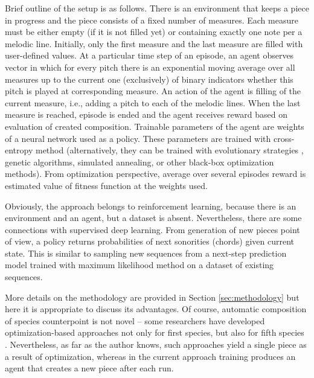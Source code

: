 \documentclass{article}
\begin{document}
Brief outline of the setup is as follows. There is an environment that keeps a piece in progress and the piece consists of a fixed number of measures. Each measure must be either empty (if it is not filled yet) or containing exactly one note per a melodic line. Initially, only the first measure and the last measure are filled with user-defined values. At a particular time step of an episode, an agent observes vector in which for every pitch there is an exponential moving average over all measures up to the current one (exclusively) of binary indicators whether this pitch is played at corresponding measure. An action of the agent is filling of the current measure, i.e., adding a pitch to each of the melodic lines. When the last measure is reached, episode is ended and the agent receives reward based on evaluation of created composition. Trainable parameters of the agent are weights of a neural network used as a policy. These parameters are trained with cross-entropy method \cite{rubinstein1997optimization} (alternatively, they can be trained with evolutionary strategies \cite{salimans2017evolution}, genetic algorithms, simulated annealing, or other black-box optimization methods). From optimization perspective, average over several episodes reward is estimated value of fitness function at the weights used.

Obviously, the approach belongs to reinforcement learning, because there is an environment and an agent, but a dataset is absent. Nevertheless, there are some connections with supervised deep learning. From generation of new pieces point of view, a policy returns probabilities of next sonorities (chords) given current state. This is similar to sampling new sequences from a next-step prediction model trained with maximum likelihood method on a dataset of existing sequences.

More details on the methodology are provided in Section \ref{sec:methodology} but here it is appropriate to discuss its advantages. Of course, automatic composition of species counterpoint is not novel -- some researchers have developed optimization-based approaches not only for first species, but also for fifth species \cite{herremans2012composing}. Nevertheless, as far as the author knows, such approaches yield a single piece as a result of optimization, whereas in the current approach training produces an agent that creates a new piece after each run.
\end{document}
